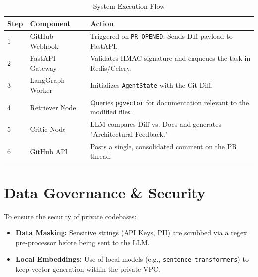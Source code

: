 \documentclass[11pt]{article}
\begin{document}
\begin{table}[h!]
\centering
\begin{tabular}{|l|l|p{8cm}|}
\hline
\textbf{Step} & \textbf{Component} & \textbf{Action} \\ \hline
1 & GitHub Webhook & Triggered on \texttt{PR\_OPENED}. Sends Diff payload to FastAPI. \\ \hline
2 & FastAPI Gateway & Validates HMAC signature and enqueues the task in Redis/Celery. \\ \hline
3 & LangGraph Worker & Initializes \texttt{AgentState} with the Git Diff. \\ \hline
4 & Retriever Node & Queries \texttt{pgvector} for documentation relevant to the modified files. \\ \hline
5 & Critic Node & LLM compares Diff vs. Docs and generates "Architectural Feedback." \\ \hline
6 & GitHub API & Posts a single, consolidated comment on the PR thread. \\ \hline
\end{tabular}
\caption{System Execution Flow}
\end{table}

\section{Data Governance \& Security}
To ensure the security of private codebases:
\begin{itemize}
    \item \textbf{Data Masking:} Sensitive strings (API Keys, PII) are scrubbed via a regex pre-processor before being sent to the LLM.
    \item \textbf{Local Embeddings:} Use of local models (e.g., \texttt{sentence-transformers}) to keep vector generation within the private VPC.
\end{itemize}
\end{document}
